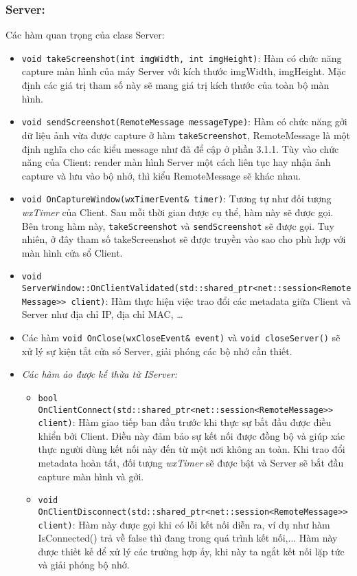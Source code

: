 \subsubsection{Server: }
\label{sec:server}
Các hàm quan trọng của class Server: 
\begin{itemize}
	\item \lstinline{void takeScreenshot(int imgWidth, int imgHeight)}: Hàm có chức năng capture màn hình của máy Server với kích thước imgWidth, imgHeight. Mặc định các giá trị tham số này sẽ mang giá trị kích thước của toàn bộ màn hình.
	\item \lstinline{void sendScreenshot(RemoteMessage messageType)}: Hàm có chức năng gởi dữ liệu ảnh vừa được capture ở hàm \lstinline{takeScreenshot}, RemoteMessage là một định nghĩa cho các kiểu message như đã để cập ở phần 3.1.1. Tùy vào chức năng của Client: render màn hình Server một cách liên tục hay nhận ảnh capture và lưu vào bộ nhớ, thì kiểu RemoteMessage sẽ khác nhau.
	\item \lstinline{void OnCaptureWindow(wxTimerEvent& timer)}: Tương tự như đối tượng \textit{wxTimer} của Client. Sau mỗi thời gian được cụ thể, hàm này sẽ được gọi. Bên trong hàm này, \lstinline{takeScreenshot} và \lstinline{sendScreenshot} sẽ được gọi. Tuy nhiên, ở đây tham số takeScreenshot sẽ được truyền vào sao cho phù hợp với màn hình cửa sổ Client.
	\item \lstinline{void ServerWindow::OnClientValidated(std::shared_ptr<net::session<RemoteMessage>> client)}: Hàm thực hiện việc trao đổi các metadata giữa Client và Server như địa chỉ IP, địa chỉ MAC, \ldots
	\item Các hàm \lstinline{void OnClose(wxCloseEvent& event)} và \lstinline{void closeServer()} sẽ xử lý sự kiện tắt cửa sổ Server, giải phóng các bộ nhớ cần thiết.
	\item \textit{Các hàm ảo được kế thừa từ IServer: }
	\begin{itemize}
		\item[] \lstinline{bool OnClientConnect(std::shared_ptr<net::session<RemoteMessage>> client)}: Hàm giao tiếp ban đầu trước khi thực sự bắt đầu được điều khiển bởi Client. Điều này đảm bảo sự kết nối được đồng bộ và giúp xác thực người dùng kết nối này đến từ một nơi không an toàn. Khi trao đổi metadata hoàn tất, đối tượng \textit{wxTimer} sẽ được bật và Server sẽ bắt đầu capture màn hình và gởi.
		\item[] \lstinline{void OnClientDisconnect(std::shared_ptr<net::session<RemoteMessage>> client)}: Hàm này được gọi khi có lỗi kết nối diễn ra, ví dụ như hàm IsConnected() trả về false thì đang trong quá trình kết nối,... Hàm này được thiết kế để xử lý các trường hợp ấy, khi này ta ngắt kết nối lặp tức và giải phóng bộ nhớ.

\end{itemize}
\end{itemize}

